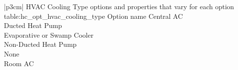 \begin{customLongTable}{ |p{3cm}| }
{HVAC Cooling Type options and properties that vary for each option} {table:hc_opt_hvac_cooling_type}
{Option name}
Central AC \\ \hline
Ducted Heat Pump \\ \hline
Evaporative or Swamp Cooler \\ \hline
Non-Ducted Heat Pump \\ \hline
None \\ \hline
Room AC \\
\end{customLongTable}
